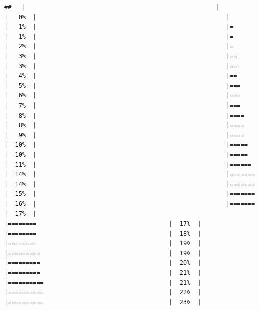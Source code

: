 \documentclass[
  krantz2]{krantz}
\begin{document}
\begin{verbatim}
##   |                                                     |                                             |   0%  |                                                     |                                             |   1%  |                                                     |=                                            |   1%  |                                                     |=                                            |   2%  |                                                     |=                                            |   3%  |                                                     |==                                           |   3%  |                                                     |==                                           |   4%  |                                                     |==                                           |   5%  |                                                     |===                                          |   6%  |                                                     |===                                          |   7%  |                                                     |===                                          |   8%  |                                                     |====                                         |   8%  |                                                     |====                                         |   9%  |                                                     |====                                         |  10%  |                                                     |=====                                        |  10%  |                                                     |=====                                        |  11%  |                                                     |======                                       |  14%  |                                                     |=======                                      |  14%  |                                                     |=======                                      |  15%  |                                                     |=======                                      |  16%  |                                                     |=======                                      |  17%  |                                                     |========                                     |  17%  |                                                     |========                                     |  18%  |                                                     |========                                     |  19%  |                                                     |=========                                    |  19%  |                                                     |=========                                    |  20%  |                                                     |=========                                    |  21%  |                                                     |==========                                   |  21%  |                                                     |==========                                   |  22%  |                                                     |==========                                   |  23%  |         
\end{verbatim}
\end{document}
